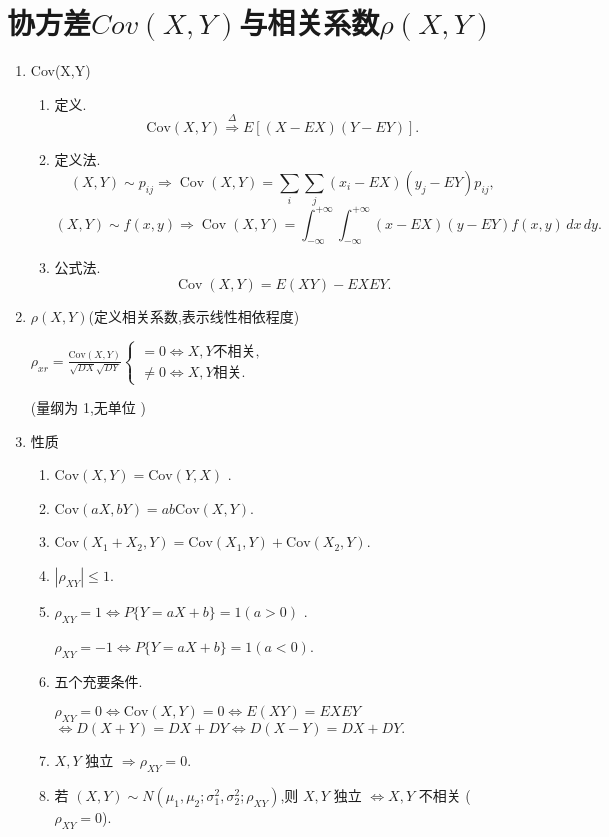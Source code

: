 \section{协方差$Cov(X,Y)$与相关系数$\rho(X,Y)$}
\begin{enumerate}
      \item Cov(X,Y)
            \begin{enumerate}
                  \item 定义.
                        $$\mathrm{Cov}(X,Y)\overset{\Delta}{\operatorname*{\Longrightarrow}}E[(X-EX)(Y-EY)].$$
                  \item 定义法.
                        $$(X,Y) \sim p_{ij} \Rightarrow \operatorname{Cov}(X,Y) = \sum_{i} \sum_{j} (x_i - EX)(y_j - EY)p_{ij},$$
                        $$(X,Y) \sim f(x,y) \Rightarrow \operatorname{Cov}(X,Y) = \int_{-\infty}^{+\infty} \int_{-\infty}^{+\infty} (x - EX)(y - EY)f(x,y) \, dx \, dy.$$
                  \item 公式法.
                        $$\operatorname{Cov}(X,Y) = E(XY) - EXEY .$$
            \end{enumerate}
      \item $\rho(X,Y)$(定义相关系数,表示线性相依程度)

            $\rho_{xr}=\frac{\mathrm{Cov}(X,Y)}{\sqrt{DX}\sqrt{DY}}\begin{cases}=0\Leftrightarrow X,Y\text{不相关,}\\\neq0\Leftrightarrow X,Y\text{相关.}\end{cases}$

            (量纲为 1,无单位 )
      \item 性质
            \begin{enumerate}
                  \item $\mathrm{Cov}(X,Y) = \mathrm{Cov}(Y,X)$ .
                  \item $\mathrm{Cov}(aX,bY) = ab\mathrm{Cov}(X,Y)$.
                  \item $\mathrm{Cov}(X_1 + X_2,Y) = \mathrm{Cov}(X_1,Y) + \mathrm{Cov}(X_2,Y)$.
                  \item $|\rho_{XY}| \le 1$.
                  \item $\rho_{XY}= 1 \Leftrightarrow P\{Y = aX + b\} = 1 (a > 0)$ .

                        $\rho_{XY}= -1 \Leftrightarrow P\{Y = aX + b\} = 1 (a < 0)$.
                  \item 五个充要条件.

                        $\rho_{XY} = 0 \Leftrightarrow \text{Cov}(X,Y) = 0 \Leftrightarrow E(XY) = EXEY$
                        $\Leftrightarrow D(X+Y) = DX + DY \Leftrightarrow D(X-Y) = DX + DY.$
                  \item  $X,Y$ 独立 $\Rightarrow \rho_{XY} = 0$.
                  \item 若 $(X,Y) \sim N(\mu_1, \mu_2; \sigma_1^2, \sigma_2^2; \rho_{XY})$,则 $X,Y$ 独立 $\Leftrightarrow X,Y$ 不相关 ($\rho_{XY} = 0$).
            \end{enumerate}
\end{enumerate}
